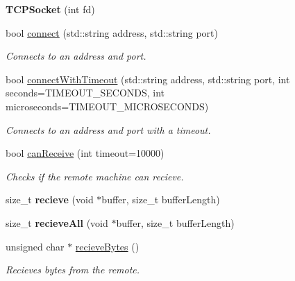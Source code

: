 \begin{DoxyCompactItemize}
\item 
\mbox{\label{classTCPSocket_a1f6081cb166796d34495e19d9a5aa1cf}} 
{\bfseries T\+C\+P\+Socket} (int fd)
\item 
bool \hyperlink{classTCPSocket_a2e2e99f5b7cba6325c48424c992be5b5}{connect} (std\+::string address, std\+::string port)
\begin{DoxyCompactList}\small\item\em Connects to an address and port. \end{DoxyCompactList}\item 
bool \hyperlink{classTCPSocket_aeeea269d2c0339e19f92109b1d1b1c32}{connect\+With\+Timeout} (std\+::string address, std\+::string port, int seconds=T\+I\+M\+E\+O\+U\+T\+\_\+\+S\+E\+C\+O\+N\+DS, int microseconds=T\+I\+M\+E\+O\+U\+T\+\_\+\+M\+I\+C\+R\+O\+S\+E\+C\+O\+N\+DS)
\begin{DoxyCompactList}\small\item\em Connects to an address and port with a timeout. \end{DoxyCompactList}\item 
bool \hyperlink{classTCPSocket_a8f94fa439a6edf2366c1fcdd8ac9114b}{can\+Receive} (int timeout=10000)
\begin{DoxyCompactList}\small\item\em Checks if the remote machine can recieve. \end{DoxyCompactList}\item 
\mbox{\label{classTCPSocket_a42edb393883abaa25b6f52477164d942}} 
size\+\_\+t {\bfseries recieve} (void $\ast$buffer, size\+\_\+t buffer\+Length)
\item 
\mbox{\label{classTCPSocket_a82e5fd63ae8afea64df9e39c0f3b6dbb}} 
size\+\_\+t {\bfseries recieve\+All} (void $\ast$buffer, size\+\_\+t buffer\+Length)
\item 
unsigned char $\ast$ \hyperlink{classTCPSocket_a7a661d5a1c283dc37b0f82e8de2d85ec}{recieve\+Bytes} ()
\begin{DoxyCompactList}\small\item\em Recieves bytes from the remote. \end{DoxyCompactList}\item 
\mbox{\label{classTCPSocket_a64c90033bb32fb537a5e79cbc4b0bcd3}} 

\end{DoxyCompactItemize}
